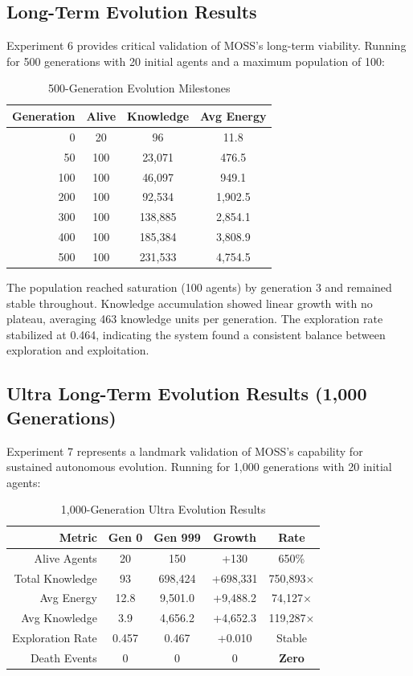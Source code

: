 \documentclass[10pt,a4paper]{article}
\begin{document}
\subsection{Long-Term Evolution Results}

Experiment 6 provides critical validation of MOSS's long-term viability. Running for 500 generations with 20 initial agents and a maximum population of 100:

\begin{table}[h]
\centering
\caption{500-Generation Evolution Milestones}
\begin{tabular}{@{}rccc@{}}
\toprule
\textbf{Generation} & \textbf{Alive} & \textbf{Knowledge} & \textbf{Avg Energy} \\
\midrule
0 & 20 & 96 & 11.8 \\
50 & 100 & 23,071 & 476.5 \\
100 & 100 & 46,097 & 949.1 \\
200 & 100 & 92,534 & 1,902.5 \\
300 & 100 & 138,885 & 2,854.1 \\
400 & 100 & 185,384 & 3,808.9 \\
500 & 100 & 231,533 & 4,754.5 \\
\bottomrule
\end{tabular}
\end{table}

The population reached saturation (100 agents) by generation 3 and remained stable throughout. Knowledge accumulation showed linear growth with no plateau, averaging 463 knowledge units per generation. The exploration rate stabilized at 0.464, indicating the system found a consistent balance between exploration and exploitation.

\subsection{Ultra Long-Term Evolution Results (1,000 Generations)}

Experiment 7 represents a landmark validation of MOSS's capability for sustained autonomous evolution. Running for 1,000 generations with 20 initial agents:

\begin{table}[h]
\centering
\caption{1,000-Generation Ultra Evolution Results}
\begin{tabular}{@{}rcccc@{}}
\toprule
\textbf{Metric} & \textbf{Gen 0} & \textbf{Gen 999} & \textbf{Growth} & \textbf{Rate} \\
\midrule
Alive Agents & 20 & 150 & +130 & 650\% \\
Total Knowledge & 93 & 698,424 & +698,331 & 750,893$\times$ \\
Avg Energy & 12.8 & 9,501.0 & +9,488.2 & 74,127$\times$ \\
Avg Knowledge & 3.9 & 4,656.2 & +4,652.3 & 119,287$\times$ \\
Exploration Rate & 0.457 & 0.467 & +0.010 & Stable \\
Death Events & 0 & 0 & 0 & \textbf{Zero} \\
\bottomrule
\end{tabular}
\end{table}
\end{document}
